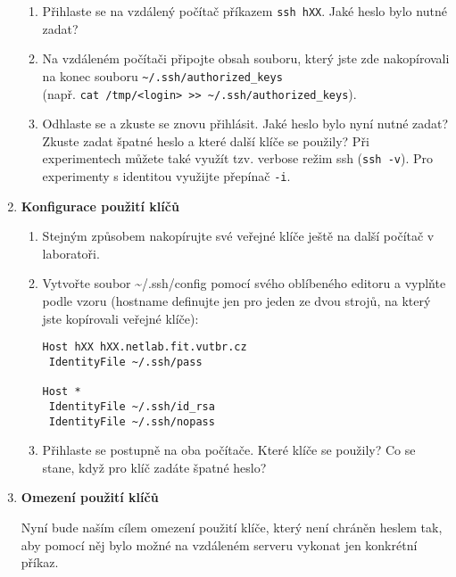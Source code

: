 \begin{enumerate}
\begin{enumerate}
      \item Přihlaste se na vzdálený počítač příkazem {\tt ssh hXX}. Jaké heslo bylo nutné zadat?

      \item Na vzdáleném počítači připojte obsah souboru, který jste zde nakopírovali na konec souboru
        {\tt \textasciitilde/.ssh/authorized\_keys} \\ (např. {\tt cat /tmp/<login> >>
        \textasciitilde/.ssh/authorized\_keys}).

      \item Odhlaste se a zkuste se znovu přihlásit. Jaké heslo bylo nyní nutné zadat? Zkuste
zadat špatné heslo a které další klíče se použily? Při experimentech můžete také
využít tzv. verbose režim ssh ({\tt ssh -v}). Pro experimenty s identitou
využijte přepínač {\tt -i}.

    \end{enumerate}

  \item {\bf Konfigurace použití klíčů}

    \begin{enumerate}

      \item Stejným způsobem nakopírujte své veřejné klíče ještě na další počítač v laboratoři.

      \item Vytvořte soubor \textasciitilde/.ssh/config pomocí svého oblíbeného editoru a
vyplňte podle vzoru (hostname definujte jen pro jeden ze dvou strojů, na který jste
kopírovali veřejné klíče):
\begin{verbatim}
Host hXX hXX.netlab.fit.vutbr.cz
 IdentityFile ~/.ssh/pass

Host *
 IdentityFile ~/.ssh/id_rsa
 IdentityFile ~/.ssh/nopass
\end{verbatim}
      \item Přihlaste se postupně na oba počítače. Které klíče se použily? Co se stane, když
pro klíč zadáte špatné heslo?

    \end{enumerate}

  \item {\bf Omezení použití klíčů}

    Nyní bude naším cílem omezení použití klíče, který není chráněn heslem tak,
    aby pomocí něj bylo možné na vzdáleném serveru vykonat jen konkrétní příkaz.

    \begin{enumerate}


\end{enumerate}
\end{enumerate}
